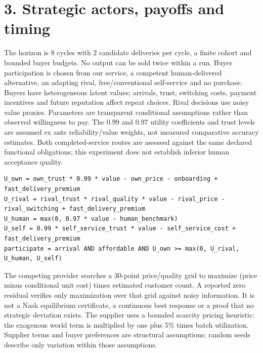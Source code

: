 \documentclass[10pt,letterpaper]{article}
\begin{document}
\section*{3. Strategic actors, payoffs and timing}
The horizon is 8 cycles with 2 candidate deliveries per cycle, a finite cohort and bounded buyer budgets. No output can be sold twice within a run. Buyer participation is chosen from our service, a competent human-delivered alternative, an adapting rival, free/conventional self-service and no purchase. Buyers have heterogeneous latent values; arrivals, trust, switching costs, payment incentives and future reputation affect repeat choices. Rival decisions use noisy value proxies. Parameters are transparent conditional assumptions rather than observed willingness to pay. The 0.99 and 0.97 utility coefficients and trust levels are assumed ex ante reliability/value weights, not measured comparative accuracy estimates. Both completed-service routes are assessed against the same declared functional obligations; this experiment does not establish inferior human acceptance quality.

\begin{Verbatim}[fontsize=\scriptsize,breaklines=true]
U_own = own_trust * 0.99 * value - own_price - onboarding + fast_delivery_premium
U_rival = rival_trust * rival_quality * value - rival_price - rival_switching + fast_delivery_premium
U_human = max(0, 0.97 * value - human_benchmark)
U_self = 0.99 * self_service_trust * value - self_service_cost + fast_delivery_premium
participate = arrival AND affordable AND U_own >= max(0, U_rival, U_human, U_self)
\end{Verbatim}
The competing provider searches a 30-point price/quality grid to maximize (price minus conditional unit cost) times estimated customer count. A reported zero residual verifies only maximization over that grid against noisy information. It is not a Nash equilibrium certificate, a continuous best response or a proof that no strategic deviation exists. The supplier uses a bounded scarcity pricing heuristic: the exogenous world term is multiplied by one plus 5\% times batch utilization. Supplier terms and buyer preferences are structural assumptions; random seeds describe only variation within those assumptions.
\end{document}
